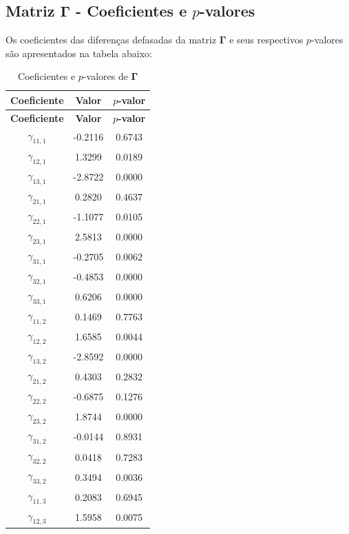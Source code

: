 \documentclass[a4paper, 12pt, openany, oneside, brazil]{abntex2}
\begin{document}
\begin{apendicesenv}
\subsection{Matriz $\mathbf{\Gamma}$ - Coeficientes e $p$-valores}

Os coeficientes das diferenças defasadas da matriz $\mathbf{\Gamma}$ e seus respectivos $p$-valores são apresentados na tabela abaixo:

\begin{longtable}{|c|c|c|}
	\caption{Coeficientes e \(p\)-valores de $\mathbf{\Gamma}$} \\ \hline
	\textbf{Coeficiente} & \textbf{Valor} & \textbf{\(p\)-valor} \\ \hline
	\endfirsthead
	\hline
	\textbf{Coeficiente} & \textbf{Valor} & \textbf{\(p\)-valor} \\ \hline
	\endhead
	\hline
	\endfoot
	\endlastfoot
	$\gamma_{11,1}$ & -0.2116 & 0.6743 \\
	\hline
	$\gamma_{12,1}$ & 1.3299 & 0.0189 \\
	\hline
	$\gamma_{13,1}$ & -2.8722 & 0.0000 \\
	\hline
	$\gamma_{21,1}$ & 0.2820 & 0.4637 \\
	\hline
	$\gamma_{22,1}$ & -1.1077 & 0.0105 \\
	\hline
	$\gamma_{23,1}$ & 2.5813 & 0.0000 \\
	\hline
	$\gamma_{31,1}$ & -0.2705 & 0.0062 \\
	\hline
	$\gamma_{32,1}$ & -0.4853 & 0.0000 \\
	\hline
	$\gamma_{33,1}$ & 0.6206 & 0.0000 \\
	\hline
	$\gamma_{11,2}$ & 0.1469 & 0.7763 \\
	\hline
	$\gamma_{12,2}$ & 1.6585 & 0.0044 \\
	\hline
	$\gamma_{13,2}$ & -2.8592 & 0.0000 \\
	\hline
	$\gamma_{21,2}$ & 0.4303 & 0.2832 \\
	\hline
	$\gamma_{22,2}$ & -0.6875 & 0.1276 \\
	\hline
	$\gamma_{23,2}$ & 1.8744 & 0.0000 \\
	\hline
	$\gamma_{31,2}$ & -0.0144 & 0.8931 \\
	\hline
	$\gamma_{32,2}$ & 0.0418 & 0.7283 \\
	\hline
	$\gamma_{33,2}$ & 0.3494 & 0.0036 \\
	\hline
	$\gamma_{11,3}$ & 0.2083 & 0.6945 \\
	\hline
	$\gamma_{12,3}$ & 1.5958 & 0.0075 \\

\end{longtable}
\end{apendicesenv}
\end{document}
